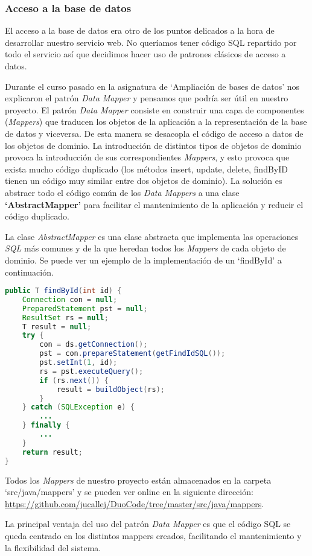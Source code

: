 \subsubsection{Acceso a la base de datos \label{sec:accesoBD}}

El acceso a la base de datos era otro de los puntos delicados a la hora de desarrollar nuestro servicio web. No queríamos tener código SQL repartido por todo el servicio así que decidimos hacer uso de patrones clásicos de acceso a datos.

Durante el curso pasado en la asignatura de `Ampliación de bases de datos' nos explicaron el patrón \textit{Data Mapper} y pensamos que podría ser útil en nuestro proyecto.
El patrón \textit{Data Mapper} consiste en construir una capa de componentes (\textit{Mappers}) que traducen los objetos de la aplicación a la representación de la base de datos y viceversa. De esta manera se desacopla el código de acceso a datos de los objetos de dominio.
La introducción de distintos tipos de objetos de dominio provoca la introducción de sus correspondientes \textit{Mappers}, y esto provoca que exista mucho código duplicado (los métodos insert, update, delete, findByID tienen un código muy similar entre dos objetos de dominio). La solución es abstraer todo el código común de los \textit{Data Mappers} a una clase \textbf{`AbstractMapper'} para facilitar el mantenimiento de la aplicación y reducir el código duplicado.

La clase \textit{AbstractMapper} es una clase abstracta que implementa las operaciones \textit{SQL} más comunes y de la que heredan todos los \textit{Mappers} de cada objeto de dominio. Se puede ver un ejemplo de la implementación de un `findById' a continuación.

\vspace{1em}
{\codesize
\lstset{}
\begin{lstlisting}[language=java, frame=single]
public T findById(int id) {
	Connection con = null;
	PreparedStatement pst = null;
	ResultSet rs = null;
	T result = null;
	try {
		con = ds.getConnection();
		pst = con.prepareStatement(getFindIdSQL());
		pst.setInt(1, id);
		rs = pst.executeQuery();
		if (rs.next()) {
			result = buildObject(rs);
		} 
	} catch (SQLException e) {
		... 
	} finally {
		... 
	}
	return result;
}
\end{lstlisting}
}
\vspace{1em}

Todos los \textit{Mappers} de nuestro proyecto están almacenados en la carpeta `src/java/mappers' y se pueden ver online en la siguiente dirección: \url{https://github.com/jucallej/DuoCode/tree/master/src/java/mappers}.

La principal ventaja del uso del patrón \textit{Data Mapper} es que el código SQL se queda centrado en los distintos mappers creados, facilitando el mantenimiento y la flexibilidad del sistema.